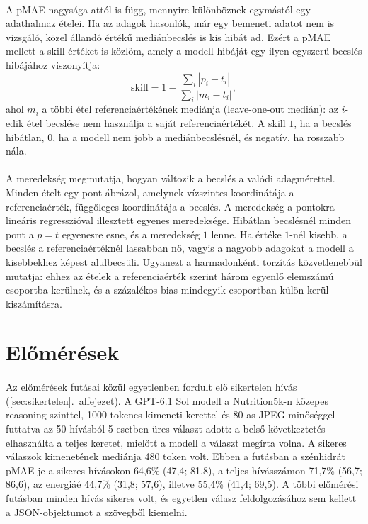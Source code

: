 \paragraph{}A pMAE nagysága attól is függ, mennyire különböznek egymástól egy 
adathalmaz ételei. Ha az adagok hasonlók, már egy bemeneti adatot nem is vizsgáló, közel állandó értékű
mediánbecslés is kis hibát ad. Ezért a pMAE mellett a skill értéket is közlöm, amely a 
modell hibáját egy ilyen egyszerű becslés hibájához viszonyítja:
\begin{equation}
  \mathrm{skill} = 1 - \frac{\sum_i |p_i - t_i|}{\sum_i |m_i - t_i|},
\end{equation}
ahol $m_i$ a többi étel referenciaértékének mediánja (leave-one-out medián): 
az $i$-edik étel becslése nem használja a saját referenciaértékét. A skill $1$, ha 
a becslés hibátlan, $0$, ha a modell nem jobb a mediánbecslésnél, és negatív, ha 
rosszabb nála.



\paragraph{}A meredekség megmutatja, hogyan változik a becslés a valódi adagmérettel. 
Minden ételt egy pont ábrázol, amelynek vízszintes koordinátája a referenciaérték, 
függőleges koordinátája a becslés. A meredekség a pontokra lineáris regresszióval 
illesztett egyenes meredeksége. Hibátlan becslésnél minden pont a $p = t$ egyenesre 
esne, és a meredekség $1$ lenne. Ha értéke $1$-nél kisebb, a becslés a referenciaértéknél 
lassabban nő, vagyis a nagyobb adagokat a modell a 
kisebbekhez képest alulbecsüli. Ugyanezt a harmadonkénti torzítás közvetlenebbül 
mutatja: ehhez az ételek a referenciaérték szerint három egyenlő elemszámú csoportba 
kerülnek, és a százalékos bias mindegyik csoportban külön kerül kiszámításra.

\section{Előmérések}
\paragraph{}Az előmérések futásai közül egyetlenben fordult elő sikertelen hívás 
(\ref{sec:sikertelen}.~alfejezet). A GPT-6.1 Sol modell a Nutrition5k-n közepes 
reasoning-szinttel, 1000 tokenes kimeneti kerettel és 80-as JPEG-minőséggel futtatva az 50 hívásból 5 esetben üres 
választ adott: a belső következtetés elhasználta a teljes keretet, mielőtt a modell a választ 
megírta volna. A sikeres válaszok kimenetének mediánja 480 token volt. Ebben a futásban a 
szénhidrát pMAE-je a sikeres hívásokon 64,6\% (47,4; 81,8), a teljes hívásszámon 
71,7\% (56,7; 86,6), az energiáé 44,7\% (31,8; 57,6), illetve 55,4\% (41,4; 69,5). 
A többi előmérési futásban minden hívás sikeres volt, és egyetlen válasz feldolgozásához 
sem kellett a JSON-objektumot a szövegből kiemelni.

